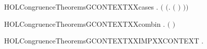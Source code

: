 \begin{SaveVerbatim}{HOLCongruenceTheoremsGCONTEXTXXcases}
       \HOLSymConst{\HOLTokenExists{}} . \ensuremath{(} \HOLSymConst{\ensuremath{=}} \ensuremath{(}\HOLTokenLambda{}.  \ensuremath{(} \ensuremath{)} \ensuremath{)}\ensuremath{)} \HOLSymConst{\HOLTokenConj{}}  
\end{SaveVerbatim}
\newcommand{\HOLCongruenceTheoremsGCONTEXTXXcases}{\UseVerbatim{HOLCongruenceTheoremsGCONTEXTXXcases}}
\begin{SaveVerbatim}{HOLCongruenceTheoremsGCONTEXTXXcombin}
\HOLTokenTurnstile{} \HOLSymConst{\HOLTokenForall{}} .   \HOLSymConst{\HOLTokenConj{}}   \HOLSymConst{\HOLTokenImp{}}  \ensuremath{(} \HOLConst{\HOLTokenCompose} \ensuremath{)}
\end{SaveVerbatim}
\newcommand{\HOLCongruenceTheoremsGCONTEXTXXcombin}{\UseVerbatim{HOLCongruenceTheoremsGCONTEXTXXcombin}}
\begin{SaveVerbatim}{HOLCongruenceTheoremsGCONTEXTXXIMPXXCONTEXT}
\HOLTokenTurnstile{} \HOLSymConst{\HOLTokenForall{}}.   \HOLSymConst{\HOLTokenImp{}}  
\end{SaveVerbatim}
\newcommand{\HOLCongruenceTheoremsGCONTEXTXXIMPXXCONTEXT}{\UseVerbatim{HOLCongruenceTheoremsGCONTEXTXXIMPXXCONTEXT}}
